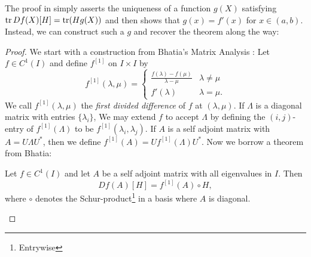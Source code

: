 The proof in \cite{pascoeTrace2020} simply asserts the uniqueness of a function
\(g(X)\) satisfying \(\operatorname{tr} Df(X)[H] = \operatorname{tr}(Hg(X))\) and then shows that
\(g(x)=f'(x)\) for \(x \in (a,b)\). Instead, we can construct such a \(g\) and
recover the theorem along the way:
\begin{proof}

We start with a construction from Bhatia's Matrix Analysis \cite{bhatiaMatrixAnalysis1997}: Let
$f \in C ^{1} (I)$ and define $f ^{[1]} $ on $I \times I$ by
\[
  f^{[1]} (\lambda,\mu) =
  \begin{cases}
    \frac{f(\lambda) - f(\mu)}{\lambda-\mu} & \lambda \neq \mu \\
    f'(\lambda) & \lambda = \mu.
  \end{cases}
\]
We call $f ^{[1]} (\lambda,\mu)$ the \emph{first divided difference} of $f$ at
$(\lambda,\mu)$. If $\Lambda$ is a diagonal matrix with entries
$\{ \lambda_{i}\} $, We may extend $f$ to accept $\Lambda$ by
defining the $(i,j)$-entry of $f ^{[1]} (\Lambda)$ to be
$f ^{[1]} (\lambda_i,\lambda_j)$. If $A$ is a self adjoint matrix with
$A = U \Lambda U ^{*} $, then we define
$f ^{[1]} (A) = U f ^{[1]} (\Lambda) U ^{*} $. Now we borrow a theorem from
Bhatia:
\begin{theorem}[Bhatia V.3.3]
  Let $f \in C ^{1} (I)$ and let $A$ be a self adjoint matrix with all
  eigenvalues in $I$. Then \[
    Df(A)[H] = f ^{[1]} (A) \circ H,
  \]
  where $\circ$ denotes the Schur-product\footnote{Entrywise} in a basis where $A$ is diagonal.
\end{theorem}


\end{proof}
